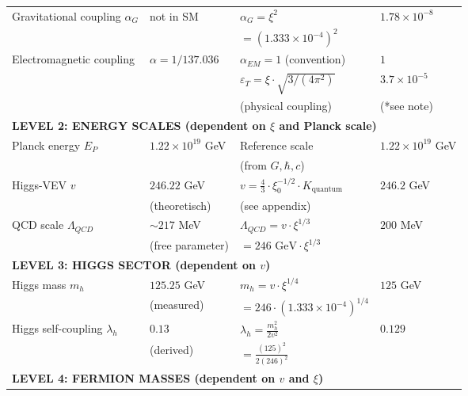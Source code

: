 \documentclass[12pt,a4paper]{article}
\begin{document}
\begin{longtable}{p{5cm}p{4cm}p{3.5cm}p{3.5cm}}
	Gravitational coupling $\alpha_G$ & not in SM & $\alpha_G = \xi^{2}$ & $1.78 \times 10^{-8}$ \\
	& & $= (1.333 \times 10^{-4})^{2}$ & \\[0.3em]
	
	Electromagnetic coupling & $\alpha = 1/137.036$ & $\alpha_{EM} = 1$ (convention) & $1$ \\
	& & $\varepsilon_T = \xi \cdot \sqrt{3/(4\pi^2)}$ & $3.7 \times 10^{-5}$ \\
	& & (physical coupling) & (*see note) \\[0.3em]
	
	\midrule
	\multicolumn{4}{l}{\textbf{LEVEL 2: ENERGY SCALES (dependent on $\xi$ and Planck scale)}} \\
	\midrule
	
	Planck energy $E_P$ & $1.22 \times 10^{19}$ GeV & Reference scale & $1.22 \times 10^{19}$ GeV \\
	& & (from $G, \hbar, c$) & \\[0.3em]
	
Higgs-VEV $v$ & $246.22$ GeV & $v = \frac{4}{3} \cdot \xi_0^{-1/2} \cdot K_{\text{quantum}}$ & $246.2$ GeV \\
& (theoretisch) & (see appendix) & \\[0.3em]
	
	QCD scale $\Lambda_{QCD}$ & $\sim 217$ MeV & $\Lambda_{QCD} = v \cdot \xi^{1/3}$ & $200$ MeV \\
	& (free parameter) & $= 246 \text{ GeV} \cdot \xi^{1/3}$ & \\[0.3em]
	
	\midrule
	\multicolumn{4}{l}{\textbf{LEVEL 3: HIGGS SECTOR (dependent on $v$)}} \\
	\midrule
	
	Higgs mass $m_h$ & $125.25$ GeV & $m_h = v \cdot \xi^{1/4}$ & $125$ GeV \\
	& (measured) & $= 246 \cdot (1.333 \times 10^{-4})^{1/4}$ & \\[0.3em]
	
	Higgs self-coupling $\lambda_h$ & $0.13$ & $\lambda_h = \frac{m_h^2}{2v^2}$ & $0.129$ \\
	& (derived) & $= \frac{(125)^2}{2(246)^2}$ & \\[0.3em]
	
	\midrule
	\multicolumn{4}{l}{\textbf{LEVEL 4: FERMION MASSES (dependent on $v$ and $\xi$)}} \\
	\midrule
	

\end{longtable}
\end{document}
